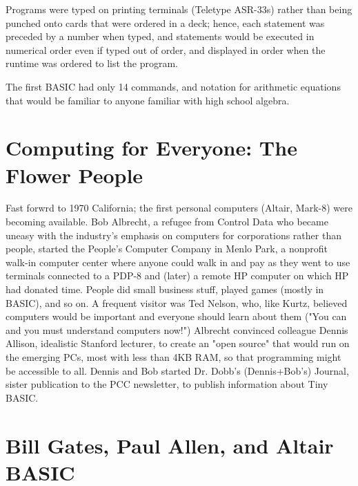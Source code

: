\documentclass{article}
\begin{document}
Programs were typed on printing terminals (Teletype ASR-33s) rather than
being punched onto cards that were ordered in a deck; hence, each
statement was preceded by a number when typed, and statements would be
executed in numerical order even if typed out of order, and displayed in
order when the runtime was ordered to list the program.



The first BASIC had only 14 commands, and notation for arithmetic
equations that would be familiar to anyone familiar with high school algebra.

\section{Computing for Everyone: The Flower People}



Fast forwrd to 1970 California; the first personal computers (Altair,
Mark-8) were becoming available.  Bob Albrecht, a refugee from Control
Data who became uneasy with the industry's emphasis on computers for
corporations rather than people, 
started the People's Computer Company in Menlo Park, a nonprofit walk-in
computer center where anyone could walk in and pay as they went to use
terminals connected to a PDP-8 and (later) a remote HP computer on which
HP had donated time.  People did small business stuff, played games
(mostly in BASIC), and so on.
A frequent visitor was Ted Nelson, who, like Kurtz, believed computers
would be important and everyone should learn about them ("You can and
you must understand computers now!")
Albrecht convinced colleague Dennis Allison,
idealistic Stanford lecturer, to create an "open source"  that
would run on the emerging PCs, most with less than 4KB RAM, so that
programming might be accessible to all.  Dennis and
Bob started Dr. Dobb's (Dennis+Bob's) Journal, sister publication to the
PCC newsletter, to publish information about Tiny BASIC.

\section{Bill Gates, Paul Allen, and Altair BASIC}


\end{document}
